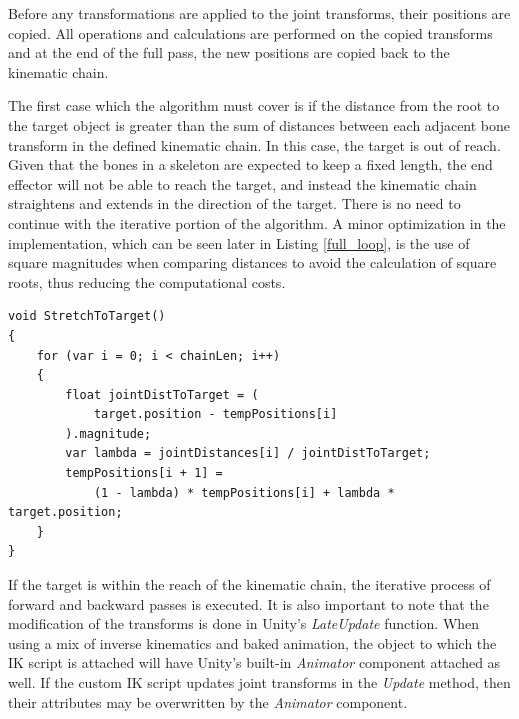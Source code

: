 Before any transformations are applied to the joint transforms, their positions
are copied. All operations and calculations are performed on the copied
transforms and at the end of the full pass, the new positions are copied back to
the kinematic chain.


The first case which the algorithm must cover is if the distance from the root
to the target object is greater than the sum of distances between each adjacent
bone transform in the defined kinematic chain. In this case, the target is out
of reach. Given that the bones in a skeleton are expected to keep a fixed
length, the end effector will not be able to reach the target, and instead the
kinematic chain straightens and extends in the direction of the target. There is
no need to continue with the iterative portion of the algorithm. A minor
optimization in the implementation, which can be seen later in Listing
\ref{full_loop}, is the use of square magnitudes when comparing distances to
avoid the calculation of square roots, thus reducing the computational costs.

\begin{lstlisting}[basicstyle=\linespread{0.9}\footnotesize\ttfamily, numbers=none,frame=single, caption={Target out of
reach. \textit{Fabrik.cs}},captionpos=t, label=stretch, language={[Sharp]c}]
void StretchToTarget()
{
    for (var i = 0; i < chainLen; i++)
    {
        float jointDistToTarget = (
            target.position - tempPositions[i]
        ).magnitude;
        var lambda = jointDistances[i] / jointDistToTarget;
        tempPositions[i + 1] =
            (1 - lambda) * tempPositions[i] + lambda * target.position;
    }
}
\end{lstlisting}

If the target is within the reach of the kinematic chain, the iterative process
of forward and backward passes is executed. It is also important to note that
the modification of the transforms is done in Unity's \textit{LateUpdate}
function. When using a mix of inverse kinematics and baked animation, the object
to which the IK script is attached will have Unity's built-in \textit{Animator}
component attached as well. If the custom IK script updates joint transforms in
the \textit{Update} method, then their attributes may be overwritten by the
\textit{Animator} component. 


